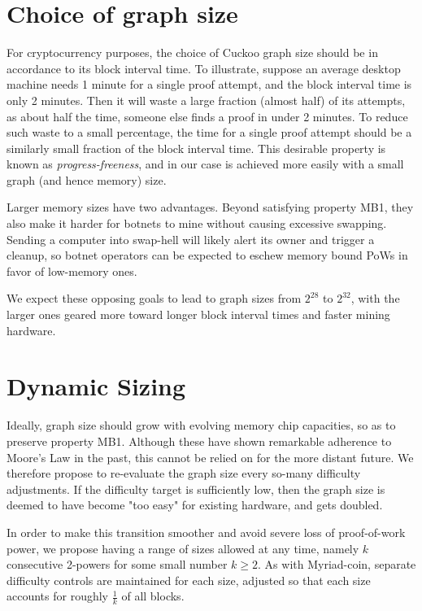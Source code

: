 \documentclass[11pt, oneside]{article}
\begin{document}
\section{Choice of graph size}
For cryptocurrency purposes, the choice of Cuckoo graph size should be in accordance to its
block interval time.
To illustrate, suppose an average desktop machine needs 1 minute for a single proof attempt,
and the block interval time is only 2 minutes. Then it will waste a large fraction (almost half)
of its attempts, as about half the time, someone else finds a proof in under 2 minutes. To reduce such waste
to a small percentage, the time for a single proof attempt should be a similarly small fraction of the block
interval time. This desirable property is known as {\em progress-freeness}, and in our case
is achieved more easily with a small graph (and hence memory) size.

Larger memory sizes have two advantages. Beyond satisfying property MB1,
they also make it harder for botnets to mine without causing excessive swapping.
Sending a computer into swap-hell will likely alert its owner and trigger a cleanup,
so botnet operators can be expected to eschew memory bound PoWs in favor of low-memory ones.

We expect these opposing goals to lead to graph sizes from $2^{28}$ to $2^{32}$, with the larger ones geared
more toward longer block interval times and faster mining hardware.

\section{Dynamic Sizing}
Ideally, graph size should grow with evolving memory chip capacities, so as to preserve property MB1.
Although these have shown remarkable adherence to Moore's Law in the past,
this cannot be relied on for the more distant future.
We therefore propose to re-evaluate the graph size every so-many difficulty adjustments.
If the difficulty target is sufficiently low, then the
graph size is deemed to have become "too easy" for existing hardware, and gets doubled.

In order to make this transition smoother and avoid severe loss of proof-of-work power,
we propose having a range of sizes allowed at any time,
namely $k$ consecutive 2-powers for some small number $k\geq 2$.
As with Myriad-coin, separate difficulty controls are maintained for each size,
adjusted so that each size accounts for roughly $\frac{1}{k}$ of all blocks.
\end{document}
